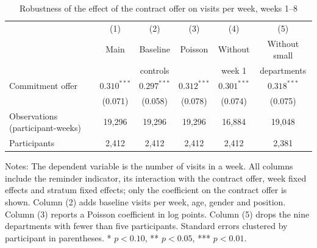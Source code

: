 \begin{table}[t]
\centering
\small
\begin{threeparttable}
\caption{Robustness of the effect of the contract offer on visits per week, weeks 1--8}
\label{tab:robust}
\begin{tabular}{@{}p{4.8cm}ccccc@{}}
\toprule
 & (1) & (2) & (3) & (4) & (5) \\
 & Main & Baseline & Poisson & Without & Without small \\
 & & controls & & week 1 & departments \\
\midrule
Commitment offer & $0.310^{***}$ & $0.297^{***}$ & $0.312^{***}$ & $0.301^{***}$ & $0.318^{***}$ \\
 & (0.071) & (0.058) & (0.078) & (0.074) & (0.075) \\
\midrule
Observations (participant-weeks) & 19,296 & 19,296 & 19,296 & 16,884 & 19,048 \\
Participants & 2,412 & 2,412 & 2,412 & 2,412 & 2,381 \\
\bottomrule
\end{tabular}
\begin{tablenotes}
\small
\item[] Notes: The dependent variable is the number of visits in a week. All columns include the reminder indicator, its interaction with the contract offer, week fixed effects and stratum fixed effects; only the coefficient on the contract offer is shown. Column (2) adds baseline visits per week, age, gender and position. Column (3) reports a Poisson coefficient in log points. Column (5) drops the nine departments with fewer than five participants. Standard errors clustered by participant in parentheses. * $p<0.10$, ** $p<0.05$, *** $p<0.01$.
\end{tablenotes}
\end{threeparttable}
\end{table}
